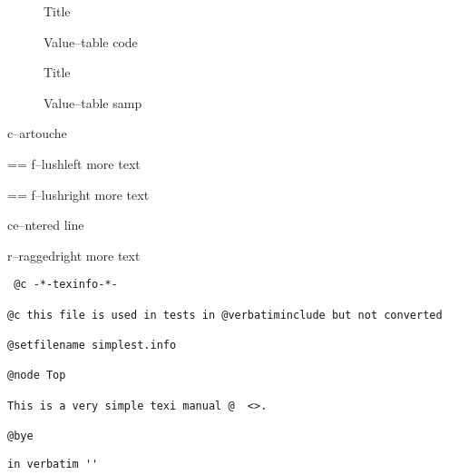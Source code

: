 \documentclass{book}
\makeatletter
\newcommand\Texinfotablestylesamp[1]{\ifstrempty{#1}{}{`\texttt{#1}'}}%
\newenvironment{Texinfopreformatted}{%
  \par\GNUTobeylines\obeyspaces\frenchspacing\parskip=\z@\parindent=\z@}{}
{\catcode`\^^M=13 \gdef\GNUTobeylines{\catcode`\^^M=13 \def^^M{\null\par}}}
\renewcommand{\_}{\Texinfounderscore\discretionary{}{}{}}
\makeatother
\begin{document}
\begin{titlepage}
\begin{description}
\item[] Title
\item[{\parbox[b]{\linewidth}{%
\texttt{a{-}{-}code}}}]
Value--table code
\end{description}

\begin{description}
\item[] Title
\item[{\parbox[b]{\linewidth}{%
\Texinfotablestylesamp{a{-}{-}samp}\\
\Texinfotablestylesamp{a2{-}{-}samp}}}]
Value--table samp
\end{description}

\begin{mdframed}[style=Texinfocartouche]
c--artouche
\end{mdframed}

\begin{flushleft}
\begin{Texinfopreformatted}%
f--lushleft
more text
\end{Texinfopreformatted}
\end{flushleft}

\begin{flushright}
\begin{Texinfopreformatted}%
f--lushright
more text
\end{Texinfopreformatted}
\end{flushright}

\begin{center}
ce--ntered line
\end{center}

\begin{flushleft}
r--raggedright
more text
\end{flushleft}

\begin{verbatim}
 @c -*-texinfo-*-

@c this file is used in tests in @verbatiminclude but not converted

@setfilename simplest.info

@node Top

This is a very simple texi manual @  <>.

@bye
\end{verbatim}

\begin{verbatim}
in verbatim ''
\end{verbatim}






\end{titlepage}
\end{document}
